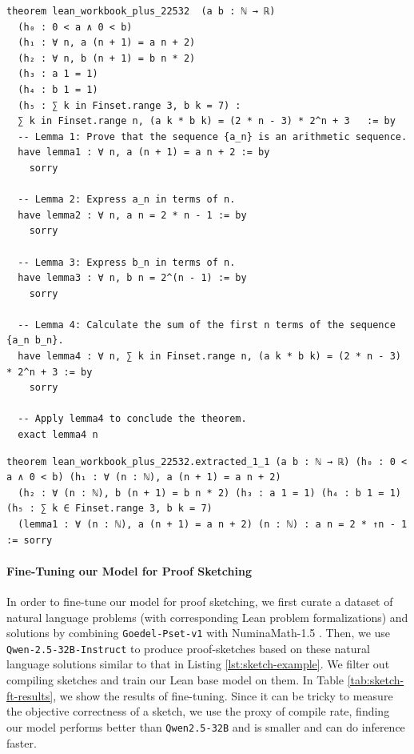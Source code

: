 \begin{tcolorbox}[colback=lightblue, boxrule=0pt, arc=5pt, outer arc=5pt, after skip=10pt plus 2pt]
\begin{lstlisting}[caption={Example of a proof sketch},label={lst:sketch-example}, captionpos=t, language=lean, breaklines=true, style=mystyle]
theorem lean_workbook_plus_22532  (a b : ℕ → ℝ)
  (h₀ : 0 < a ∧ 0 < b)
  (h₁ : ∀ n, a (n + 1) = a n + 2)
  (h₂ : ∀ n, b (n + 1) = b n * 2)
  (h₃ : a 1 = 1)
  (h₄ : b 1 = 1)
  (h₅ : ∑ k in Finset.range 3, b k = 7) :
  ∑ k in Finset.range n, (a k * b k) = (2 * n - 3) * 2^n + 3   := by
  -- Lemma 1: Prove that the sequence {a_n} is an arithmetic sequence.
  have lemma1 : ∀ n, a (n + 1) = a n + 2 := by
    sorry

  -- Lemma 2: Express a_n in terms of n.
  have lemma2 : ∀ n, a n = 2 * n - 1 := by
    sorry

  -- Lemma 3: Express b_n in terms of n.
  have lemma3 : ∀ n, b n = 2^(n - 1) := by
    sorry

  -- Lemma 4: Calculate the sum of the first n terms of the sequence {a_n b_n}.
  have lemma4 : ∀ n, ∑ k in Finset.range n, (a k * b k) = (2 * n - 3) * 2^n + 3 := by
    sorry

  -- Apply lemma4 to conclude the theorem.
  exact lemma4 n
\end{lstlisting}
\end{tcolorbox}

\begin{tcolorbox}[colback=lightblue, boxrule=0pt, arc=5pt, outer arc=5pt, after skip=10pt plus 2pt]
\begin{lstlisting}[caption={Example of an extracted theorem},label={lst:extractgoal-example}, captionpos=t, language=lean, breaklines=true, style=mystyle]
theorem lean_workbook_plus_22532.extracted_1_1 (a b : ℕ → ℝ) (h₀ : 0 < a ∧ 0 < b) (h₁ : ∀ (n : ℕ), a (n + 1) = a n + 2)
  (h₂ : ∀ (n : ℕ), b (n + 1) = b n * 2) (h₃ : a 1 = 1) (h₄ : b 1 = 1) (h₅ : ∑ k ∈ Finset.range 3, b k = 7)
  (lemma1 : ∀ (n : ℕ), a (n + 1) = a n + 2) (n : ℕ) : a n = 2 * ↑n - 1 := sorry
\end{lstlisting}
\end{tcolorbox}

\paragraph{Fine-Tuning our Model for Proof Sketching} In order to fine-tune our model for proof sketching, we first curate a dataset of natural language problems (with corresponding Lean problem formalizations) and solutions by combining \texttt{Goedel-Pset-v1} \citep{lin2025goedel} with NuminaMath-1.5 \citep{numina_math_datasets}. Then, we use \texttt{Qwen-2.5-32B-Instruct} to produce proof-sketches based on these natural language solutions similar to that in Listing \ref{lst:sketch-example}. We filter out compiling sketches and train our Lean base model on them. In Table \ref{tab:sketch-ft-results}, we show the results of fine-tuning. Since it can be tricky to measure the objective correctness of a sketch, we use the proxy of compile rate, finding our model performs better than \texttt{Qwen2.5-32B} and is smaller and can do inference faster.

